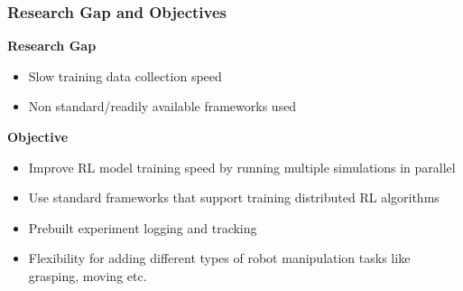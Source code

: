 \documentclass{beamer}
\begin{document}
	\begin{frame}
		\frametitle{Research Gap and Objectives}
		\textbf{Research Gap}
		\begin{itemize}
			\item Slow training data collection speed
			\item Non standard/readily available frameworks used
		\end{itemize}
		\vspace{1em}
		\textbf{Objective} \\
		\begin{itemize}
			\item Improve RL model training speed by running multiple simulations in parallel
			\item Use standard frameworks that support training distributed RL algorithms
			\item Prebuilt experiment logging and tracking
			\item Flexibility for adding different types of robot manipulation tasks like grasping, moving etc.
		\end{itemize}
	\end{frame}
\end{document}
